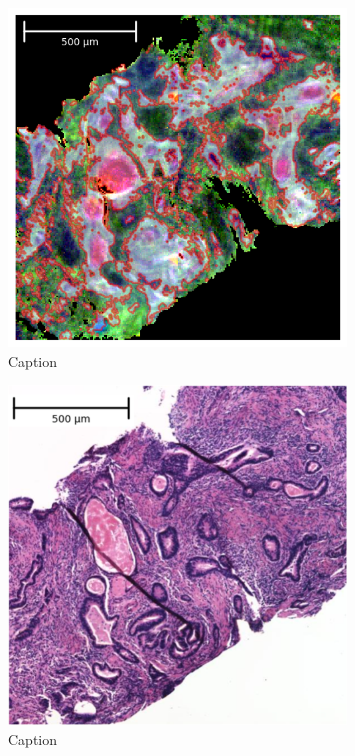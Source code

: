 \begin{figure}[htbp]
  \centering
  \includegraphics[width=0.8\textwidth]{Images/False_Colour_IR_17.png}
  \caption{Caption}
  \label{fig:my-label}
\end{figure}

\begin{figure}[htbp]
  \centering
  \includegraphics[width=0.8\textwidth]{Images/he_17_scale.png}
  \caption{Caption}
  \label{fig:my-label}
\end{figure}

